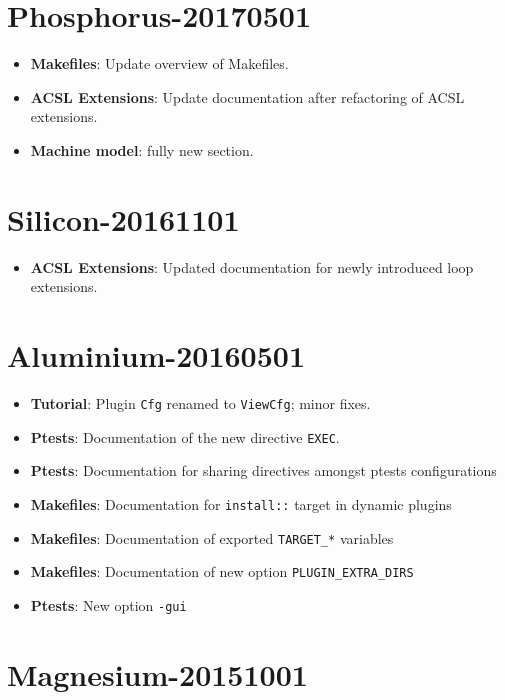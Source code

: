 \section*{Phosphorus-20170501}

\begin{itemize}
\item \textbf{Makefiles}: Update overview of Makefiles.
\item\textbf{ACSL Extensions}: Update documentation after refactoring of
ACSL extensions.
\item\textbf{Machine model}: fully new section.
\end{itemize}

\section*{Silicon-20161101}

\begin{itemize}
\item\textbf{ACSL Extensions}: Updated documentation for newly
introduced loop extensions.
\end{itemize}

\section*{Aluminium-20160501}

\begin{itemize}
\item \textbf{Tutorial}: Plugin \texttt{Cfg} renamed to \texttt{ViewCfg};
  minor fixes.
\item \textbf{Ptests}: Documentation of the new directive \texttt{EXEC}.
\item \textbf{Ptests}: Documentation for sharing directives amongst ptests
  configurations
\item \textbf{Makefiles}: Documentation for \texttt{install::} target
 in dynamic plugins
\item \textbf{Makefiles}: Documentation of exported \texttt{TARGET\_*} variables
\item \textbf{Makefiles}: Documentation of new option
\texttt{PLUGIN\_EXTRA\_DIRS}
\item \textbf{Ptests}: New option \texttt{-gui}
\end{itemize}

\section*{Magnesium-20151001}

